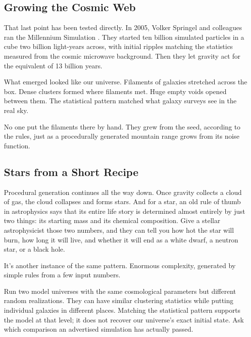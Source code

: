 \subsection{Growing the Cosmic Web}

That last point has been tested directly. In 2005, Volker Springel and colleagues ran the Millennium Simulation \cite{springel2005}. They started ten billion simulated particles in a cube two billion light-years across, with initial ripples matching the statistics measured from the cosmic microwave background. Then they let gravity act for the equivalent of 13 billion years.

What emerged looked like our universe. Filaments of galaxies stretched across the box. Dense clusters formed where filaments met. Huge empty voids opened between them. The statistical pattern matched what galaxy surveys see in the real sky.

No one put the filaments there by hand. They grew from the seed, according to the rules, just as a procedurally generated mountain range grows from its noise function.

\subsection{Stars from a Short Recipe}

Procedural generation continues all the way down. Once gravity collects a cloud of gas, the cloud collapses and forms stars. And for a star, an old rule of thumb in astrophysics says that its entire life story is determined almost entirely by just two things: its starting mass and its chemical composition. Give a stellar astrophysicist those two numbers, and they can tell you how hot the star will burn, how long it will live, and whether it will end as a white dwarf, a neutron star, or a black hole.

It's another instance of the same pattern. Enormous complexity, generated by simple rules from a few input numbers.

\begin{quickpracticebox}
Run two model universes with the same cosmological parameters but different random realizations. They can have similar clustering statistics while putting individual galaxies in different places. Matching the statistical pattern supports the model at that level; it does not recover our universe's exact initial state. Ask which comparison an advertised simulation has actually passed.
\end{quickpracticebox}

